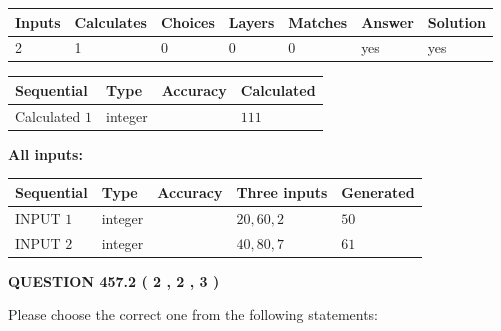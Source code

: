 \documentclass[12pt]{article}
\begin{document}
 
\noindent{}
 
 

 
   
   
   
   
\noindent\begin{tabular}{|l|l|l|l|l|l|l|}
 \hline
Inputs & Calculates & Choices & Layers & Matches & Answer & Solution \\ \hline
 2  & 
 1  & 
 0
  & 
 0  & 
 0  & 
  yes & 
  yes 
  \\ \hline
 \end{tabular}
   
   
   
   
\noindent{}
   
   
  
  
\noindent\begin{tabular}{|l|l|l|l|}
\hline
 Sequential & Type & Accuracy & Calculated \\ 
\hline
 
 
  Calculated $  1 $ & integer &  & 
  $ 111 $ 
 \\  \hline  
 \end{tabular}
   
   
   
   
\noindent\vspace{0.1in}\hspace{-0.08in} {\textbf{\Large{All inputs: }}}
   
   
  
  
\noindent\begin{tabular}{|l|l|l|l|l|}
\hline
 Sequential & Type & Accuracy & Three inputs & Generated \\ 
\hline
 
 
  INPUT $  1 $ & integer &  & $
 20
 , 
 60
 , 
 2
 $ & $ 50 $ 
 \\  \hline  
 
 
  INPUT $  2 $ & integer &  & $
 40
 , 
 80
 , 
 7
 $ & $ 61 $ 
 \\  \hline  
 \end{tabular}
   
   
  
\vspace{0.2in}
  
{\textbf{\Large{QUESTION
457.2 
 ( 2 , 2 , 3 )
}}}
  
  
Please choose the correct one from the following statements:
 
\end{document}
